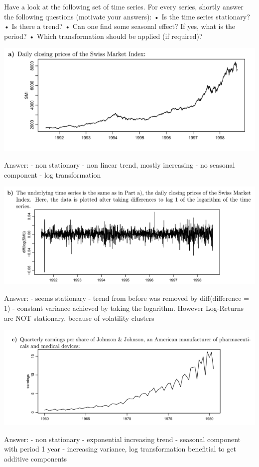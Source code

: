 \documentclass[
]{article}
\begin{document}
Have a look at the following set of time series. For every series,
shortly answer the following questions (motivate your answers): • Is the
time series stationary? • Is there a trend? • Can one find some seasonal
effect? If yes, what is the period? • Which transformation should be
applied (if required)?

\includegraphics[width=1\linewidth]{Ex1.3a}

Answer: - non stationary - non linear trend, mostly increasing - no
seasonal component - log transformation

\includegraphics[width=1\linewidth]{Ex1.3b}

Answer: - seems stationary - trend from before was removed by
diff(difference = 1) - constant variance achieved by taking the
logarithm. However Log-Returns are NOT stationary, because of volatility
clusters

\includegraphics[width=1\linewidth]{Ex1.3c}

Answer: - non stationary - exponential increasing trend - seasonal
component with period 1 year - increasing variance, log transformation
benefitial to get additive components
\end{document}
